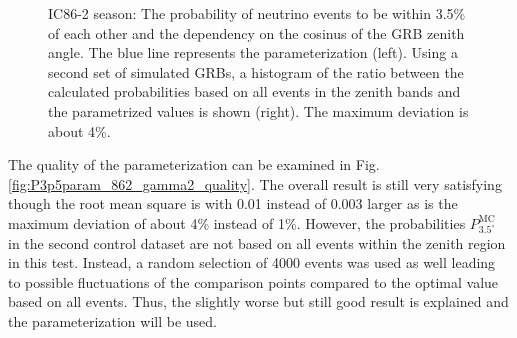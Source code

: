 \begin{figure}[h]
\centering
 \captionsetup{width=.9\textwidth}
\caption{IC86-2 season: The probability of neutrino events to be within 3.5\% 
of each other and the dependency on the cosinus of the GRB zenith angle. The 
blue line represents the parameterization (left). Using a second set of 
simulated GRBs, a histogram 
of the ratio between the calculated probabilities based on all events in 
the zenith bands and the parametrized values is shown (right). The maximum 
deviation 
is about 4\%.}
\end{figure}
The quality of the parameterization can be examined in Fig. 
\ref{fig:P3p5param_862_gamma2_quality}. The overall result is still very 
satisfying though the root mean square is with 0.01 instead of 0.003 larger as 
is the maximum deviation of about 4\% instead of 1\%. However, the 
probabilities $P_{3.5^\circ}^\text{MC}$ in the second control dataset are 
not based on all events within the zenith region in this test. Instead, a 
random selection of 4000 events was used as well leading to possible 
fluctuations of the comparison points compared to the optimal value based on all 
events.
Thus, the slightly worse but still good result is explained and the 
parameterization will be used.

